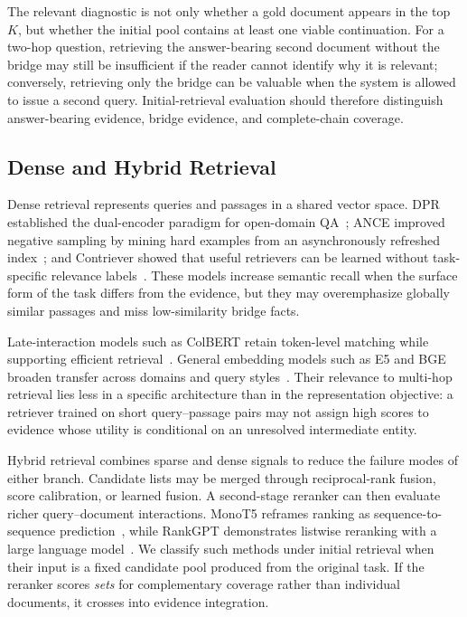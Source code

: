 The relevant diagnostic is not only whether a gold document appears in the top $K$, but whether the initial pool contains at least one viable continuation. For a two-hop question, retrieving the answer-bearing second document without the bridge may still be insufficient if the reader cannot identify why it is relevant; conversely, retrieving only the bridge can be valuable when the system is allowed to issue a second query. Initial-retrieval evaluation should therefore distinguish answer-bearing evidence, bridge evidence, and complete-chain coverage.

\subsection{Dense and Hybrid Retrieval}
\label{subsec:dense_hybrid_retrieval}

Dense retrieval represents queries and passages in a shared vector space. DPR established the dual-encoder paradigm for open-domain QA~\cite{karpukhin2020dpr}; ANCE improved negative sampling by mining hard examples from an asynchronously refreshed index~\cite{xiong2020ance}; and Contriever showed that useful retrievers can be learned without task-specific relevance labels~\cite{izacard2022contriever}. These models increase semantic recall when the surface form of the task differs from the evidence, but they may overemphasize globally similar passages and miss low-similarity bridge facts.

Late-interaction models such as ColBERT retain token-level matching while supporting efficient retrieval~\cite{khattab2020colbert,santhanam2022colbertv2}. General embedding models such as E5 and BGE broaden transfer across domains and query styles~\cite{wang2022e5,xiao2024bge}. Their relevance to multi-hop retrieval lies less in a specific architecture than in the representation objective: a retriever trained on short query--passage pairs may not assign high scores to evidence whose utility is conditional on an unresolved intermediate entity.

Hybrid retrieval combines sparse and dense signals to reduce the failure modes of either branch. Candidate lists may be merged through reciprocal-rank fusion, score calibration, or learned fusion. A second-stage reranker can then evaluate richer query--document interactions. MonoT5 reframes ranking as sequence-to-sequence prediction~\cite{nogueira2020monot5}, while RankGPT demonstrates listwise reranking with a large language model~\cite{sun2023rankgpt}. We classify such methods under initial retrieval when their input is a fixed candidate pool produced from the original task. If the reranker scores \emph{sets} for complementary coverage rather than individual documents, it crosses into evidence integration.

